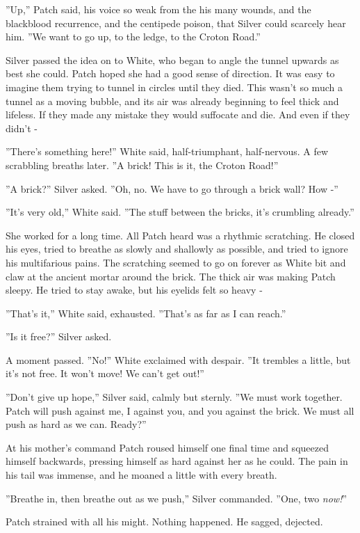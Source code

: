 \documentclass[12pt]{book}
\begin{document}
''Up,'' Patch said, his voice so weak from the his many wounds, and the blackblood recurrence, and the centipede poison, that Silver could scarcely hear him. ''We want to go up, to the ledge, to the Croton Road.''

Silver passed the idea on to White, who began to angle the tunnel upwards as best she could. Patch hoped she had a good sense of direction. It was easy to imagine them trying to tunnel in circles until they died. This wasn't so much a tunnel as a moving bubble, and its air was already beginning to feel thick and lifeless. If they made any mistake they would suffocate and die. And even if they didn't -

''There's something here!'' White said, half-triumphant, half-nervous. A few scrabbling breaths later. ''A brick! This is it, the Croton Road!''

''A brick?'' Silver asked. ''Oh, no. We have to go through a brick wall? How -''

''It's very old,'' White said. ''The stuff between the bricks, it's crumbling already.''

She worked for a long time. All Patch heard was a rhythmic scratching. He closed his eyes, tried to breathe as slowly and shallowly as possible, and tried to ignore his multifarious pains. The scratching seemed to go on forever as White bit and claw at the ancient mortar around the brick. The thick air was making Patch sleepy. He tried to stay awake, but his eyelids felt so heavy -

''That's it,'' White said, exhausted. ''That's as far as I can reach.''

''Is it free?'' Silver asked.

A moment passed. ''No!'' White exclaimed with despair. ''It trembles a little, but it's not free. It won't move! We can't get out!''

''Don't give up hope,'' Silver said, calmly but sternly. ''We must work together. Patch will push against me, I against you, and you against the brick. We must all push as hard as we can. Ready?''

At his mother's command Patch roused himself one final time and squeezed himself backwards, pressing himself as hard against her as he could. The pain in his tail was immense, and he moaned a little with every breath.

''Breathe in, then breathe out as we push,'' Silver commanded. ''One, two %
{\it now!}''

Patch strained with all his might. Nothing happened. He sagged, dejected.
\end{document}

